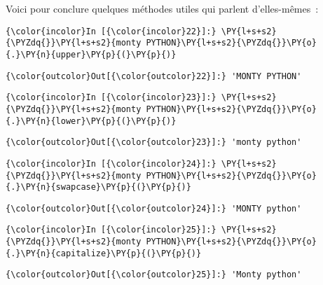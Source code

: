     Voici pour conclure quelques méthodes utiles qui parlent d'elles-mêmes~:

    \begin{Verbatim}[commandchars=\\\{\}]
{\color{incolor}In [{\color{incolor}22}]:} \PY{l+s+s2}{\PYZdq{}}\PY{l+s+s2}{monty PYTHON}\PY{l+s+s2}{\PYZdq{}}\PY{o}{.}\PY{n}{upper}\PY{p}{(}\PY{p}{)}
\end{Verbatim}


\begin{Verbatim}[commandchars=\\\{\}]
{\color{outcolor}Out[{\color{outcolor}22}]:} 'MONTY PYTHON'
\end{Verbatim}
            
    \begin{Verbatim}[commandchars=\\\{\}]
{\color{incolor}In [{\color{incolor}23}]:} \PY{l+s+s2}{\PYZdq{}}\PY{l+s+s2}{monty PYTHON}\PY{l+s+s2}{\PYZdq{}}\PY{o}{.}\PY{n}{lower}\PY{p}{(}\PY{p}{)}
\end{Verbatim}


\begin{Verbatim}[commandchars=\\\{\}]
{\color{outcolor}Out[{\color{outcolor}23}]:} 'monty python'
\end{Verbatim}
            
    \begin{Verbatim}[commandchars=\\\{\}]
{\color{incolor}In [{\color{incolor}24}]:} \PY{l+s+s2}{\PYZdq{}}\PY{l+s+s2}{monty PYTHON}\PY{l+s+s2}{\PYZdq{}}\PY{o}{.}\PY{n}{swapcase}\PY{p}{(}\PY{p}{)}
\end{Verbatim}


\begin{Verbatim}[commandchars=\\\{\}]
{\color{outcolor}Out[{\color{outcolor}24}]:} 'MONTY python'
\end{Verbatim}
            
    \begin{Verbatim}[commandchars=\\\{\}]
{\color{incolor}In [{\color{incolor}25}]:} \PY{l+s+s2}{\PYZdq{}}\PY{l+s+s2}{monty PYTHON}\PY{l+s+s2}{\PYZdq{}}\PY{o}{.}\PY{n}{capitalize}\PY{p}{(}\PY{p}{)}
\end{Verbatim}


\begin{Verbatim}[commandchars=\\\{\}]
{\color{outcolor}Out[{\color{outcolor}25}]:} 'Monty python'
\end{Verbatim}
            
